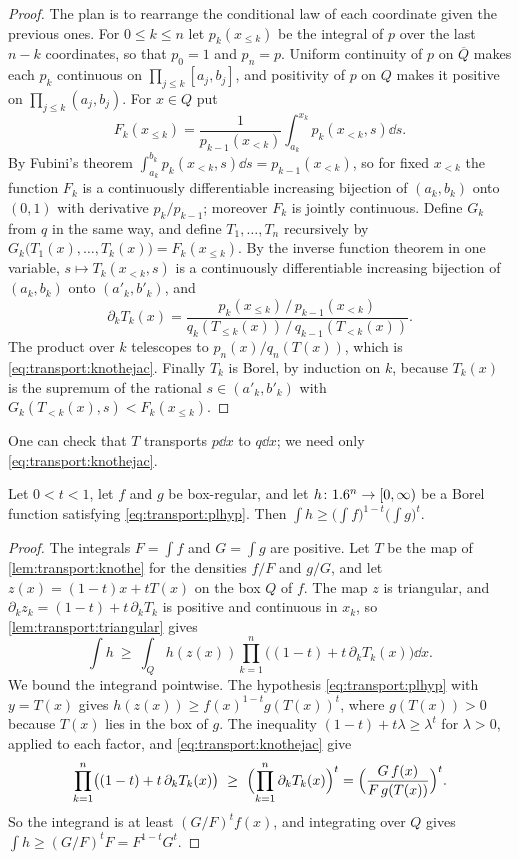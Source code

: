 \begin{refsection}
\begin{proof}
The plan is to rearrange the conditional law of each coordinate given the previous ones. For $0\le k\le n$ let $p_k(x_{\le k})$ be the integral of $p$ over the last $n-k$ coordinates, so that $p_0=1$ and $p_n=p$. Uniform continuity of $p$ on $\overline Q$ makes each $p_k$ continuous on $\prod_{j\le k}[a_j,b_j]$, and positivity of $p$ on $Q$ makes it positive on $\prod_{j\le k}(a_j,b_j)$. For $x\in Q$ put
\[
F_k(x_{\le k})=\frac{1}{p_{k-1}(x_{<k})}\int_{a_k}^{x_k}p_k(x_{<k},s)\dd s.
\]
By Fubini's theorem $\int_{a_k}^{b_k}p_k(x_{<k},s)\dd s=p_{k-1}(x_{<k})$, so for fixed $x_{<k}$ the function $F_k$ is a continuously differentiable increasing bijection of $(a_k,b_k)$ onto $(0,1)$ with derivative $p_k/p_{k-1}$; moreover $F_k$ is jointly continuous. Define $G_k$ from $q$ in the same way, and define $T_1,\dots,T_n$ recursively by $G_k\bigl(T_1(x),\dots,T_k(x)\bigr)=F_k(x_{\le k})$. By the inverse function theorem in one variable, $s\mapsto T_k(x_{<k},s)$ is a continuously differentiable increasing bijection of $(a_k,b_k)$ onto $(a'_k,b'_k)$, and
\[
\partial_kT_k(x)=\frac{p_k(x_{\le k})\,/\,p_{k-1}(x_{<k})}{q_k(T_{\le k}(x))\,/\,q_{k-1}(T_{<k}(x))}.
\]
The product over $k$ telescopes to $p_n(x)/q_n(T(x))$, which is \eqref{eq:transport:knothejac}. Finally $T_k$ is Borel, by induction on $k$, because $T_k(x)$ is the supremum of the rational $s\in(a'_k,b'_k)$ with $G_k(T_{<k}(x),s)<F_k(x_{\le k})$.
\end{proof}

One can check that $T$ transports $p\dd x$ to $q\dd x$; we need only \eqref{eq:transport:knothejac}.

\begin{theorem}\label{thm:transport:plbox}
Let $0<t<1$, let $f$ and $g$ be box-regular, and let $h\colon1.6^n\to[0,\infty)$ be a Borel function satisfying \eqref{eq:transport:plhyp}. Then $\int h\ge\bigl(\int f\bigr)^{1-t}\bigl(\int g\bigr)^t$.
\end{theorem}

\begin{proof}
The integrals $F=\int f$ and $G=\int g$ are positive. Let $T$ be the map of \cref{lem:transport:knothe} for the densities $f/F$ and $g/G$, and let $z(x)=(1-t)x+tT(x)$ on the box $Q$ of $f$. The map $z$ is triangular, and $\partial_kz_k=(1-t)+t\,\partial_kT_k$ is positive and continuous in $x_k$, so \cref{lem:transport:triangular} gives
\[
\int h\ \ge\ \int_Q h(z(x))\prod_{k=1}^n\bigl((1-t)+t\,\partial_kT_k(x)\bigr)\dd x.
\]
We bound the integrand pointwise. The hypothesis \eqref{eq:transport:plhyp} with $y=T(x)$ gives $h(z(x))\ge f(x)^{1-t}g(T(x))^t$, where $g(T(x))>0$ because $T(x)$ lies in the box of $g$. The inequality $(1-t)+t\lambda\ge\lambda^t$ for $\lambda>0$, applied to each factor, and \eqref{eq:transport:knothejac} give
\[
\prod_{k=1}^n\bigl((1-t)+t\,\partial_kT_k(x)\bigr)\ \ge\ \Bigl(\prod_{k=1}^n\partial_kT_k(x)\Bigr)^{t}=\Bigl(\frac{G\,f(x)}{F\,g(T(x))}\Bigr)^{t}.
\]
So the integrand is at least $(G/F)^tf(x)$, and integrating over $Q$ gives $\int h\ge(G/F)^tF=F^{1-t}G^t$.
\end{proof}


\end{refsection}
